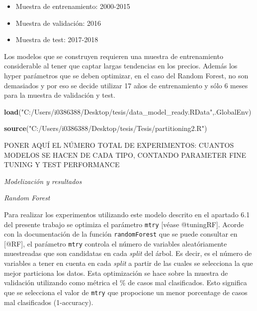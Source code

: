 \documentclass[]{article}
\newenvironment{Shaded}{\begin{snugshade}}{\end{snugshade}}
\newcommand{\KeywordTok}[1]{\textcolor[rgb]{0.13,0.29,0.53}{\textbf{#1}}}
\newcommand{\StringTok}[1]{\textcolor[rgb]{0.31,0.60,0.02}{#1}}
\newcommand{\NormalTok}[1]{#1}
\providecommand{\tightlist}{%
  \setlength{\itemsep}{0pt}\setlength{\parskip}{0pt}}
\begin{document}
\begin{itemize}
\tightlist
\item
  Muestra de entrenamiento: 2000-2015
\item
  Muestra de validación: 2016
\item
  Muestra de test: 2017-2018
\end{itemize}

\setlength\parskip{5ex} Los modelos que se construyen requieren una
muestra de entrenamiento considerable al tener que captar largas
tendencias en los precios. Además los hyper parámetros que se deben
optimizar, en el caso del Random Forest, no son demasiados y por eso se
decide utilizar 17 años de entrenamiento y sólo 6 meses para la muestra
de validación y test.

\begin{Shaded}
\begin{Highlighting}[]
\KeywordTok{load}\NormalTok{(}\StringTok{"C:/Users/i0386388/Desktop/tesis/data_model_ready.RData"}\NormalTok{,.GlobalEnv)}
\end{Highlighting}
\end{Shaded}

\begin{Shaded}
\begin{Highlighting}[]
\KeywordTok{source}\NormalTok{(}\StringTok{"C:/Users/i0386388/Desktop/tesis/Tesis/partitioning2.R"}\NormalTok{)}
\end{Highlighting}
\end{Shaded}

PONER AQUÍ EL NÚMERO TOTAL DE EXPERIMENTOS: CUANTOS MODELOS SE HACEN DE
CADA TIPO, CONTANDO PARAMETER FINE TUNING Y TEST PERFORMANCE

\emph{Modelización y resultados}

\emph{Random Forest}

\setlength\parskip{5ex} Para realizar los experimentos utilizando este
modelo descrito en el apartado 6.1 del presente trabajo se optimiza el
parámetro \texttt{mtry} {[}véase @tuningRF{]}. Acorde con la
documentación de la función \texttt{randomForest} que se puede consultar
en {[}@RF{]}, el parámetro \texttt{mtry} controla el número de variables
aleatóriamente muestreadas que son candidatas en cada \emph{split} del
árbol. Es decir, es el número de variables a tener en cuenta en cada
\emph{split} a partir de las cuales se selecciona la que mejor
particiona los datos. Esta optimización se hace sobre la muestra de
validación utilizando como métrica el \% de casos mal clasificados. Esto
significa que se selecciona el valor de \texttt{mtry} que propocione un
menor porcentage de casos mal clasificados (1-accuracy).
\end{document}
